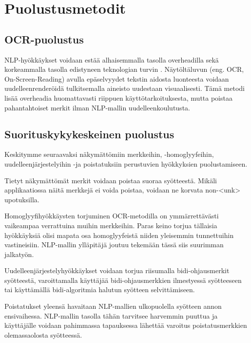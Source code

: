 \chapter{Puolustusmetodit\label{results}}
\section{OCR-puolustus}
NLP-hyökkäykset voidaan estää alhaisemmalla tasolla overheadilla sekä korkeammalla tasolla edistyneen teknologian turvin \citep{boucher2021bad}. Näytöltäluvun (eng. OCR, On-Screen-Reading) avulla epäselvyydet tekstin aidosta luonteesta voidaan uudelleenrenderöidä tulkitsemalla aineisto uudestaan visuaalisesti. Tämä metodi lisää overheadia huomattavasti riippuen käyttötarkoituksesta, mutta poistaa pahantahtoiset merkit ilman NLP-mallin uudelleenkoulutusta.

\section{Suorituskykykeskeinen puolustus}
Keskitymme seuraavaksi näkymättömiin merkkeihin, -homoglyyfeihin, \-uudelleenjärjestelyihin -ja poistatuksiin perustuvien hyökkyksien puolustamiseen.

Tietyt näkymättömät merkit voidaan poistaa suoraa syötteestä. Mikäli applikaatiossa näitä merkkejä ei voida poistaa, voidaan ne korvata non-<unk> upotuksilla.

Homoglyyfihyökkäysten torjuminen OCR-metodilla on ymmärrettävästi vaikeampaa verrattuina muihin merkkeihin. Paras keino torjua tällaisia hyökkäyksiä olisi mapata osa homoglyyfeistä niiden yleisemmin tunnettuihin vastineisiin. NLP-mallin ylläpitäjä joutuu tekemään tässä siis suurimman jalkatyön.

Uudelleenjärjestelyhyökkäykset voidaan torjua riisumalla bidi-ohjausmerkit syötteestä, varoittamalla käyttäjää bidi-ohjausmerkkien ilmestyessä syötteeseen tai käyttämällä bidi-algoritmia halutun syötteen selvittämiseen.

Poistatukset yleensä havaitaan NLP-mallien ulkopuolella syötteen annon ensivaihessa. NLP-mallin tasolla tähän tarvitsee harvemmin puuttua ja käyttäjälle voidaan pahimmassa tapauksessa lähettää varoitus poistatusmerkkien olemassaolosta syötteessä.
